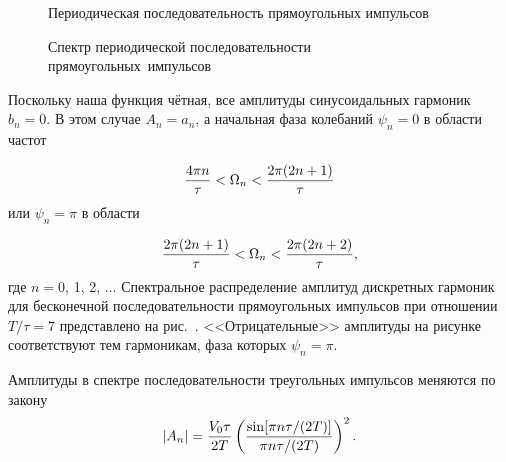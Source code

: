 
\begin{figure}[h!]
\begin{minipage}{0.45\textwidth}
	\caption{Периодическая последовательность прямоугольных импульсов}
\end{minipage}
\hfill
\begin{minipage}{0.45\textwidth}
	\caption{Спектр периодической последовательности прямоугольных~импульсов}
\end{minipage}
\end{figure}

Поскольку наша функция чётная, все амплитуды синусоидальных гармоник $b_n=0$. В этом случае $A_n=a_n$, а начальная фаза
колебаний $\psi_n=0$ в области частот

\begin{equation}
	\frac{4\pi n}{\tau}<\Omega_n<\frac{2\pi (2n+1)}{\tau}
	\eqmark{6.2.3}
\end{equation}
или $\psi_n=\pi$ в области

\begin{equation}
	\frac{2\pi(2n+1)}{\tau} < \Omega_n < \frac{2\pi (2n+2)}{\tau},
	\eqmark{6.2.4}
\end{equation}
где $n=0$, 1, 2, $\dots$ Спектральное распределение амплитуд дискретных гармоник для бесконечной последовательности прямоугольных импульсов при отношении $T/\tau=7$ представлено на рис.~.
<<Отрицательные>> амплитуды на рисунке соответствуют тем гармоникам, фаза которых $\psi_n=\pi$.


Амплитуды в спектре последовательности треугольных импульсов меняются по закону
\begin{equation}
	|A_n|=\frac{V_0\tau}{2T} \left(\frac{\sin[\pi n\tau/(2T)]} {\pi n\tau/(2T)}\right)^2.
	\eqmark{6.2.5}
\end{equation}

